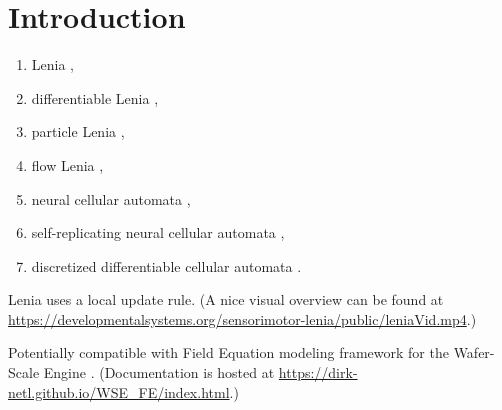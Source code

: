 \section{Introduction} \label{sec:introduction}

\begin{enumerate}
\item Lenia \citep{chan2020lenia,chan2019lenia},
\item differentiable Lenia \citep{hamon2022learning},
\item particle Lenia \citep{mordvintsev2022particle},
\item flow Lenia \citep{plantec2023flowlenia},
\item neural cellular automata \citep{mordvintsev2020growing},
\item self-replicating neural cellular automata \citep{sinapayen2023selfreplication},
\item discretized differentiable cellular automata \citep{miotti2025differentiable}.
\end{enumerate}

Lenia uses a local update rule.
(A nice visual overview can be found at \url{https://developmentalsystems.org/sensorimotor-lenia/public/leniaVid.mp4}.)

Potentially compatible with Field Equation modeling framework for the Wafer-Scale Engine \citep{woo2022disruptive}.
(Documentation is hosted at \url{https://dirk-netl.github.io/WSE_FE/index.html}.)


